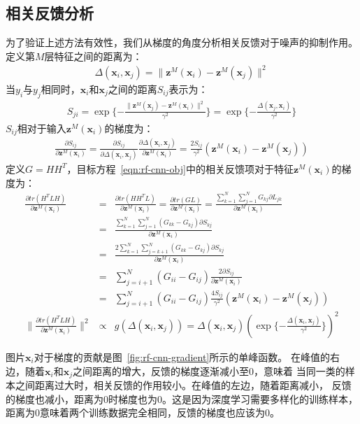 \documentclass[doctor]{ustcthesis}
\def \x {\mathbf{x}}
\def \z {\mathbf{z}}
\begin{document}
\subsection{相关反馈分析}
为了验证上述方法有效性，我们从梯度的角度分析相关反馈对于噪声的抑制作用。
定义第$M$层特征之间的距离为：
\begin{eqnarray}
    \Delta(\x_i, \x_j) = \|\z^M(\x_i) - \z^M(\x_j)\|^2
\end{eqnarray}
当$y_i$与$y_j$相同时，$\x_i$和$\x_j$之间的距离$S_{ij}$表示为：
\begin{eqnarray}
    S_{ji}
    = \exp\{-\frac{\|\z^M(\x_j) - \z^M(\x_i)\|^2}{\gamma^2}\}
    = \exp\{-\frac{\Delta(\x_j, \x_i)}{\gamma^2}\}
\end{eqnarray}
$S_{ij}$相对于输入$\z^M(\x_i)$的梯度为：
\begin{eqnarray}
    \frac{\partial S_{ij}}{\partial \z^M(\x_i)} =
    \frac{\partial S_{ij}}{\partial \Delta(\x_i, \x_j)}
    \frac{\partial \Delta(\x_i, \x_j)}{\partial \z^M(\x_i)} =
    \frac{2S_{ij}}{\gamma^2}(\z^M(\x_i) - \z^M(\x_j))
\end{eqnarray}
定义$G=HH^T$，目标方程~\eqref{eqn:rf-cnn-obj}中的相关反馈项对于特征$\z^M(\x_i)$的梯度为：
\begin{eqnarray}
    \frac{\partial tr(H^TLH)}{\partial \z^M(\x_i)} &=&
    \frac{\partial tr(HH^TL)}{\partial \z^M(\x_i)} =
    \frac{\partial tr(GL)}{\partial \z^M(\x_i)}
    =\frac{\sum_{k=1}^N\sum_{j=1}^N{G_{kj}\partial L_{jk}}}{\partial \z^M(\x_i)}
    \nonumber \\
    &=&\frac{\sum_{k=1}^N\sum_{j=1}^N{(G_{kk} - G_{kj})\partial S_{kj}}}{\partial \z^M(\x_i)}
    \nonumber \\
    &=&\frac{2\sum_{k=1}^N\sum_{j=k+1}^N{(G_{kk} - G_{kj})\partial S_{kj}}}{\partial \z^M(\x_i)}
    \nonumber \\
    &=&\sum_{j=i+1}^N{(G_{ii} - G_{ij})}\frac{2\partial S_{ij}}{\partial \z^M(\x_i)}
    \nonumber \\
    &=&\sum_{j=i+1}^N{(G_{ii} - G_{ij})\frac{4S_{ij}}{\gamma^2}(\z^M(\x_i) - \z^M(\x_j))} \\
    \|\frac{\partial tr(H^TLH)}{\partial \z^M(\x_i)}\|^2 &\propto&
    g(\Delta(\x_i, \x_j)) = \Delta(\x_i, \x_j)(\exp\{-\frac{\Delta(\x_i, \x_j)}{\gamma^2}\})^2
\end{eqnarray}

图片$\x_i$对于梯度的贡献是图~\ref{fig:rf-cnn-gradient}所示的单峰函数。
在峰值的右边，随着$\x_i$和$\x_j$之间距离的增大，反馈的梯度逐渐减小至0，意味着
当同一类的样本之间距离过大时，相关反馈的作用较小。在峰值的左边，随着距离减小，
反馈的梯度也减小，距离为0时梯度也为0。这是因为深度学习需要多样化的训练样本，
距离为0意味着两个训练数据完全相同，反馈的梯度也应该为0。
\end{document}
